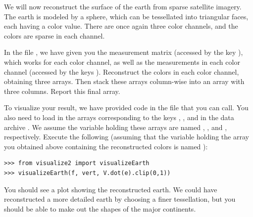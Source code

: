 \begin{problem}
We will now reconstruct the surface of the earth from sparse satellite imagery. The earth is modeled by a sphere,
which can be tessellated into triangular faces, each having a color value. There are once again three color
channels, and the colors are sparse in each channel.

In the file , we have given you the measurement matrix (accessed by the key ),
which works for each color channel, as well as the measurements in each color channel
(accessed by the keys ). Reconstruct the colors in each color channel, obtaining
three arrays. Then stack these arrays column-wise into an array with three columns. Report this final array.

To visualize your result, we have provided code in the file  that you can call.
You also need to load in the arrays corresponding to the keys ,
, and  in the data archive
. We assume the variable holding these arrays are named , ,
and ,
respectively.
Execute the following (assuming that the variable holding the array
you obtained above containing the reconstructed colors is named ):
\begin{lstlisting}
>>> from visualize2 import visualizeEarth
>>> visualizeEarth(f, vert, V.dot(e).clip(0,1))
\end{lstlisting}
You should see a plot showing the reconstructed earth. We could have reconstructed a more detailed
earth by choosing a finer tessellation, but you should be able to make out the shapes of the major continents.
\end{problem} 
